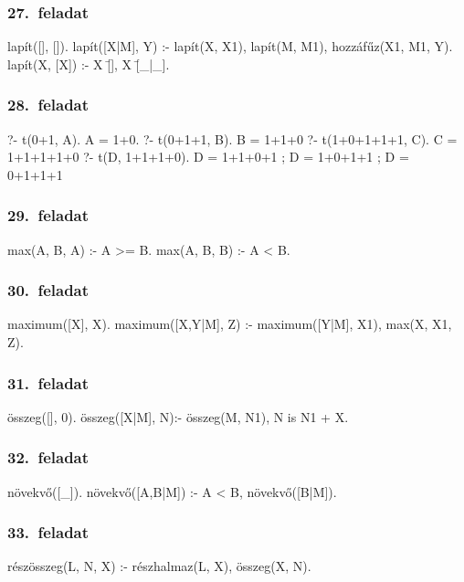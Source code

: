 \subsubsection*{27.~feladat}
\begin{program}
lapít([], []). 
lapít([X|M], Y) :-
    lapít(X, X1), lapít(M, M1),
    hozzáfűz(X1, M1, Y). 
lapít(X, [X]) :- X \= [], X \= [_|_]. 
\end{program}
\subsubsection*{28.~feladat}
\begin{query}
?- t(0+1, A).
A = 1+0.
?- t(0+1+1, B).
B = 1+1+0
?- t(1+0+1+1+1, C).
C = 1+1+1+1+0
?- t(D, 1+1+1+0).
D = 1+1+0+1 ;
D = 1+0+1+1 ;
D = 0+1+1+1
\end{query}
\subsubsection*{29.~feladat}
\begin{program}
max(A, B, A) :- A >= B. 
max(A, B, B) :- A < B. 
\end{program}
\subsubsection*{30.~feladat}
\begin{program}
maximum([X], X).
maximum([X,Y|M], Z) :-
    maximum([Y|M], X1), max(X, X1, Z).
\end{program}
\subsubsection*{31.~feladat}
\begin{program}
összeg([], 0). 
összeg([X|M], N):- összeg(M, N1), N is N1 + X. 
\end{program}
\subsubsection*{32.~feladat}
\begin{program}
növekvő([_]). 
növekvő([A,B|M]) :- A < B, növekvő([B|M]). 
\end{program}
\subsubsection*{33.~feladat}
\begin{program}
részösszeg(L, N, X) :-
    részhalmaz(L, X), összeg(X, N).
\end{program}
